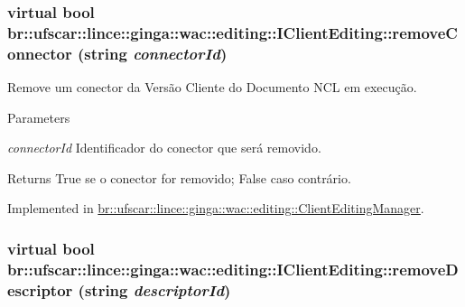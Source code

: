 \hypertarget{classbr_1_1ufscar_1_1lince_1_1ginga_1_1wac_1_1editing_1_1IClientEditing_a415ff450552523a495db85c15004c6f9}{
\subsubsection[{removeConnector}]{\setlength{\rightskip}{0pt plus 5cm}virtual bool br::ufscar::lince::ginga::wac::editing::IClientEditing::removeConnector (string {\em connectorId})}}
\label{classbr_1_1ufscar_1_1lince_1_1ginga_1_1wac_1_1editing_1_1IClientEditing_a415ff450552523a495db85c15004c6f9}


Remove um conector da Versão Cliente do Documento NCL em execução. 


\begin{DoxyParams}{Parameters}
\item[{\em connectorId}]Identificador do conector que será removido. \end{DoxyParams}
\begin{DoxyReturn}{Returns}
True se o conector for removido; False caso contrário. 
\end{DoxyReturn}


Implemented in \hyperlink{classbr_1_1ufscar_1_1lince_1_1ginga_1_1wac_1_1editing_1_1ClientEditingManager_a5b6ddc8a6259b07eae8f2c2f03dcdfaa}{br::ufscar::lince::ginga::wac::editing::ClientEditingManager}.

\hypertarget{classbr_1_1ufscar_1_1lince_1_1ginga_1_1wac_1_1editing_1_1IClientEditing_ad3ae20153844de461ded8a643443dc08}{
\subsubsection[{removeDescriptor}]{\setlength{\rightskip}{0pt plus 5cm}virtual bool br::ufscar::lince::ginga::wac::editing::IClientEditing::removeDescriptor (string {\em descriptorId})}}
\label{classbr_1_1ufscar_1_1lince_1_1ginga_1_1wac_1_1editing_1_1IClientEditing_ad3ae20153844de461ded8a643443dc08}


